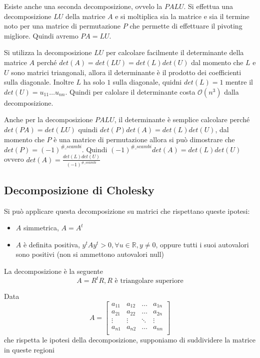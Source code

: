 Esiste anche una seconda decomposizione, ovvelo la $PALU$. Si effettua una decomposizione
$LU$ della matrice $A$ e si moltiplica sia la matrice e sia il termine noto per una 
matrice di permutazione $P$ che permette di effettuare il pivoting migliore.
Quindi avremo $PA=LU$.

\begin{nota}
    Si utilizza la decomposizione $LU$ per calcolare facilmente il determinante
    della matrice $A$ perché $det(A)=det(LU) = det(L)det(U)$ dal momento che 
    $L$ e $U$ sono matrici triangonali, allora il determinante è il prodotto dei 
    coefficienti sulla diagonale. Inoltre $L$ ha solo $1$ sulla diagonale, quidni 
    $det(L) = 1$ mentre il $det(U)= u_{11}\dots u_{nn}$. Quindi per calolare 
    il determinante costa $\mathcal{O}(n^3)$ dalla decomposizione.
\end{nota}

\begin{nota}
    Anche per la decomposizione $PALU$, il determinante è semplice calcolare perché
    $det(PA)= det(LU)$ quindi $det(P)det(A)=det(L)det(U)$, dal momento che $P$ è
    una matrice di permutazione allora si può dimostrare che 
    $det(P) = (-1)^{\#\_scambi}$. Quindi $(-1)^{\#\_scambi}det(A)=det(L)det(U)$ ovvero
    $det(A)=\frac{det(L)det(U)}{(-1)^{\#\_scambi}}$
\end{nota}

\subsection{Decomposizione di Cholesky}
Si può applicare questa decomposizione su matrici che rispettano queste ipotesi:
\begin{itemize}
    \item $A$ simmetrica, $A=A^t$
    \item $A$ è definita positiva, $y^t A y^t >0, \forall u\in \mathbb{R}, y\ne 0$,
    oppure tutti i suoi autovalori sono positivi (non si ammettono autovalori null)
\end{itemize}
La decomposizione è la seguente
\begin{equation*}
    A= R^tR, R \text{ è triangolare superiore}
\end{equation*} 

Data 
\begin{equation*}
    A=\left[\begin{array}{cccc}
        a_{11}&a_{12} & \dots & a_{1n}\\
        a_{21}&a_{22} & \dots & a_{2n}\\
        \vdots&\vdots & \ddots & \vdots\\
        a_{n1}&a_{n2} & \dots & a_{nn}\\
    \end{array}\right]
\end{equation*}
che rispetta le ipotesi della decomposizione, supponiamo di 
suddividere la matrice in queste regioni

